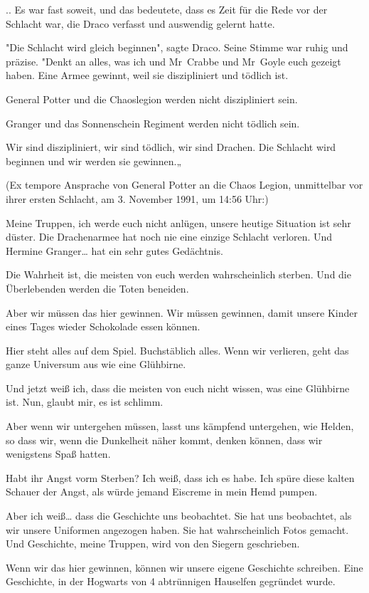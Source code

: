 {.. Es war fast soweit, und das bedeutete, dass es Zeit für die Rede vor der Schlacht war, die Draco verfasst und auswendig gelernt hatte.

"Die Schlacht wird gleich beginnen", sagte Draco. Seine Stimme war ruhig und präzise. "Denkt an alles, was ich und Mr~Crabbe und Mr~Goyle euch gezeigt haben. Eine Armee gewinnt, weil sie diszipliniert und tödlich ist.

General Potter und die Chaoslegion werden nicht diszipliniert sein.

Granger und das Sonnenschein Regiment werden nicht tödlich sein.

Wir sind diszipliniert, wir sind tödlich, wir sind Drachen. Die Schlacht wird beginnen und wir werden sie gewinnen.„

(Ex tempore Ansprache von General Potter an die Chaos Legion, unmittelbar vor ihrer ersten Schlacht, am 3. November 1991, um 14:56 Uhr:)

Meine Truppen, ich werde euch nicht anlügen, unsere heutige Situation ist sehr düster. Die Drachenarmee hat noch nie eine einzige Schlacht verloren. Und Hermine Granger… hat ein sehr gutes Gedächtnis.

Die Wahrheit ist, die meisten von euch werden wahrscheinlich sterben. Und die Überlebenden werden die Toten beneiden.

Aber wir müssen das hier gewinnen. Wir müssen gewinnen, damit unsere Kinder eines Tages wieder Schokolade essen können.

Hier steht alles auf dem Spiel. Buchstäblich alles. Wenn wir verlieren, geht das ganze Universum aus wie eine Glühbirne.

Und jetzt weiß ich, dass die meisten von euch nicht wissen, was eine Glühbirne ist. Nun, glaubt mir, es ist schlimm.

Aber wenn wir untergehen müssen, lasst uns kämpfend untergehen, wie Helden, so dass wir, wenn die Dunkelheit näher kommt, denken können, dass wir wenigstens Spaß hatten.

Habt ihr Angst vorm Sterben? Ich weiß, dass ich es habe. Ich spüre diese kalten Schauer der Angst, als würde jemand Eiscreme in mein Hemd pumpen.

Aber ich weiß… dass die Geschichte uns beobachtet. Sie hat uns beobachtet, als wir unsere Uniformen angezogen haben. Sie hat wahrscheinlich Fotos gemacht. Und Geschichte, meine Truppen, wird von den Siegern geschrieben.

Wenn wir das hier gewinnen, können wir unsere eigene Geschichte schreiben. Eine Geschichte, in der Hogwarts von 4 abtrünnigen Hauselfen gegründet wurde.

}
